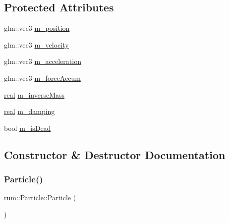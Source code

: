 \subsection*{Protected Attributes}
\begin{DoxyCompactItemize}
\item 
glm\+::vec3 \hyperlink{classrum_1_1_particle_a6e7c397b620c9d03fb6c7d4359649d40}{m\+\_\+position}
\item 
glm\+::vec3 \hyperlink{classrum_1_1_particle_a8dfab481a4ef728d40e86f7369baf307}{m\+\_\+velocity}
\item 
glm\+::vec3 \hyperlink{classrum_1_1_particle_aee85fab3a2d274ecc7d997f1c0c34132}{m\+\_\+acceleration}
\item 
glm\+::vec3 \hyperlink{classrum_1_1_particle_afe25996db7b8665b775e4b46d52fea50}{m\+\_\+force\+Accum}
\item 
\hyperlink{namespacerum_a7e8cca23573d5eaead0f138cbaa4862c}{real} \hyperlink{classrum_1_1_particle_a7fa92aadbccc9d999d84cef129cf8870}{m\+\_\+inverse\+Mass}
\item 
\hyperlink{namespacerum_a7e8cca23573d5eaead0f138cbaa4862c}{real} \hyperlink{classrum_1_1_particle_a76f5e4b0ed29a1d86419230621dd1047}{m\+\_\+damping}
\item 
bool \hyperlink{classrum_1_1_particle_ab056fc8b2187694c0742bd234b9cc6a3}{m\+\_\+is\+Dead}
\end{DoxyCompactItemize}


\subsection{Constructor \& Destructor Documentation}
\mbox{\label{classrum_1_1_particle_a9ae5ce0fc18a8be75950b336b92ecd75}} 
\subsubsection{\texorpdfstring{Particle()}{Particle()}}
{\footnotesize\ttfamily rum\+::\+Particle\+::\+Particle (\begin{DoxyParamCaption}{ }\end{DoxyParamCaption})\hspace{0.3cm}{\ttfamily [explicit]}}

\mbox{\label{classrum_1_1_particle_abc143197fe05fa60a1a3ccbf7b5f0fe8}} 
